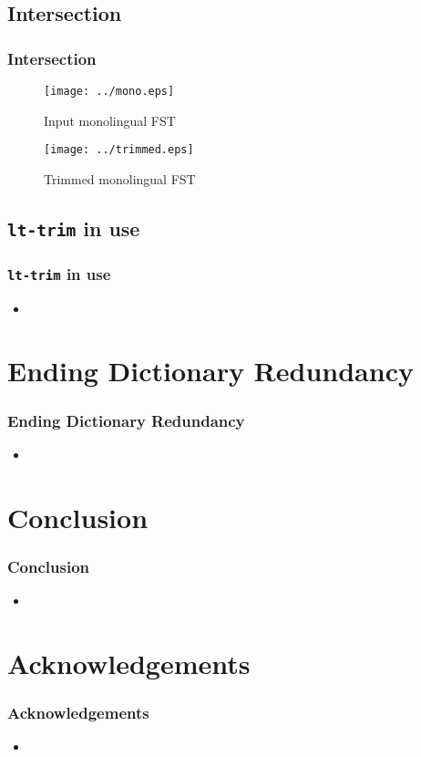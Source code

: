 \documentclass[notes=hide]{beamer}
\newcommand{\tool}[1]{\texttt{#1}}
\begin{document}
\subsection{Intersection}
\begin{frame}
  \frametitle{Intersection}

  \begin{figure}[h]
    \begin{center}
      \texttt{[image: ../mono.eps]}
      \caption{Input monolingual FST}
      \label{fig:mono}
    \end{center}
  \end{figure}

  \begin{figure}[h]
    \begin{center}
      \texttt{[image: ../trimmed.eps]}
      \caption{Trimmed monolingual FST}
      \label{fig:trimmed}
    \end{center}
  \end{figure}

\end{frame}

\subsection{\tool{lt-trim} in use}
\begin{frame}
  \frametitle{\tool{lt-trim} in use}
  \begin{itemize}
  \item
  \end{itemize}
\end{frame}

\section{Ending Dictionary Redundancy}
\begin{frame}
  \frametitle{Ending Dictionary Redundancy}
  \begin{itemize}
  \item
  \end{itemize}
\end{frame}

\section{Conclusion}
\begin{frame}
  \frametitle{Conclusion}
  \begin{itemize}
  \item
  \end{itemize}
\end{frame}

\section*{Acknowledgements}
\begin{frame}
  \frametitle{Acknowledgements}
  \begin{itemize}
  \item
  \end{itemize}
\end{frame}
\end{document}
